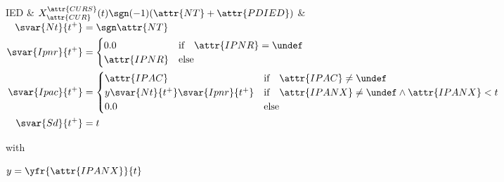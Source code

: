 	IED & $X_{\attr{CUR}}^{\attr{CURS}}(t)\sgn(-1)(\attr{NT}+\attr{PDIED})$
		& {$\begin{aligned}
			\svar{Nt}{t^+} &=\sgn\attr{NT} \\
			\svar{Ipnr}{t^+} &= \begin{cases} 0.0 & \text{if} \quad \attr{IPNR}=\undef \\
							\attr{IPNR} & \text{else} \end{cases} \\
			\svar{Ipac}{t^+} &= \begin{cases} \attr{IPAC} & \text{if} \quad \attr{IPAC} \neq \undef \\
							y\svar{Nt}{t^+}\svar{Ipnr}{t^+} & \text{if} \quad \attr{IPANX} \neq \undef \land \attr{IPANX}<t \\
							0.0 & \text{else} \end{cases} \\
			\svar{Sd}{t^+} &= t \end{aligned}$}\par
		with\par
		$y=\yfr{\attr{IPANX}}{t}$ \\
